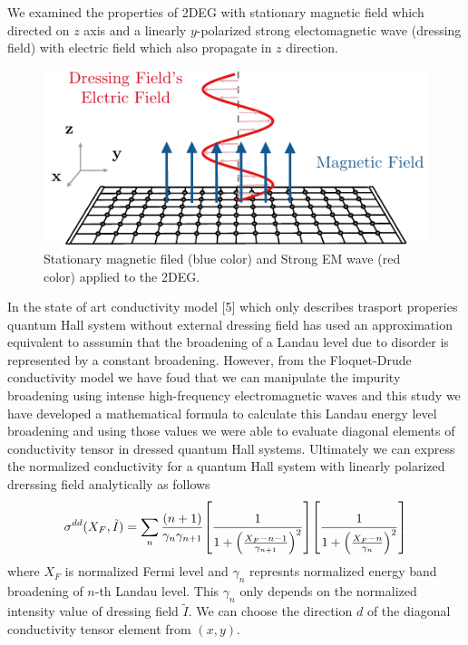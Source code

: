 \documentclass[a4paper]{article}
\numberwithin{equation}{subsection}
\numberwithin{equation}{section}
\begin{document}
We examined the properties of 2DEG with stationary magnetic field which directed on $z$ axis and a linearly $y$-polarized strong electomagnetic wave (dressing field) with electric field which also propagate in $z$ direction.
\begin{figure}[ht!]
  \centering
  \includegraphics[scale=0.9]{figures/fig1.pdf}
  \caption{Stationary magnetic filed (blue color) and Strong EM wave (red color) applied to the 2DEG.}
  \label{fig:2}
\end{figure}

In the state of art conductivity model [5] which only describes trasport properies quantum Hall system without external dressing field has used an approximation equivalent to asssumin that the broadening of a Landau level due to disorder is represented by a constant broadening. However, from the Floquet-Drude conductivity model we have foud that we can manipulate the impurity broadening using intense high-frequency electromagnetic waves and this study we have developed a mathematical formula to calculate this Landau energy level broadening and using those values we were able to evaluate diagonal elements of conductivity tensor in dressed quantum Hall systems. Ultimately we can express the normalized conductivity for a quantum Hall system with linearly polarized drerssing field analytically as follows
\begin{equation*}
    \sigma^{dd}(X_F,\tilde{I}) =
    \sum_{n}
    \frac{\qty(n+1)}{\gamma_{n}\gamma_{n+1}}
    \qty[
      \frac{1}
      {
        1 + \qty(\frac{X_F - n -1}{\gamma_{n+1}})^2
      }
    ]
    \qty[
      \frac{1}
      {
        1 + \qty(\frac{X_F - n}{\gamma_{n}})^2
      }
    ]
\end{equation*}
where $X_F$ is normalized Fermi level and $\gamma_n$ represnts normalized energy band broadening of $n$-th Landau level. This $\gamma_n$ only depends on the normalized intensity value of dressing field $\tilde{I}$. We can choose the direction $d$ of the diagonal conductivity tensor element from $(x,y)$.
\end{document}
